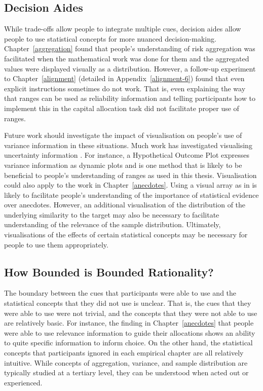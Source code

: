 \documentclass[a4paper, nobind]{templates/ociamthesis}
\theoremstyle{definition}
\theoremstyle{definition}
\theoremstyle{definition}
\theoremstyle{definition}
\theoremstyle{remark}
\begin{document}
\subsection{Decision Aides}

While trade-offs allow people to integrate multiple cues, decision aides allow
people to use statistical concepts for more nuanced decision-making.
Chapter~\ref{aggregation} found that people's understanding of risk aggregation
was facilitated when the mathematical work was done for them and the aggregated
values were displayed visually as a distribution. However, a follow-up
experiment to Chapter~\ref{alignment} (detailed in Appendix~\ref{alignment-6})
found that even explicit instructions sometimes do not work. That is, even
explaining the way that ranges can be used as reliability information and
telling participants how to implement this in the capital allocation task did
not facilitate proper use of ranges.

Future work should investigate the impact of visualisation on people's use of
variance information in these situations. Much work has investigated visualising
uncertainty information \autocite{bostrom2008,maceachren1992,kinkeldey2017,padilla2018,davis1997,ristovski2014,brodlie2012,johnson2003,potter2012,lipkus1999,lipkus2007,spiegelhalter2011,pang1997,kox2018,lapinski2009,torsneyweir2015}. For instance, a Hypothetical Outcome Plot
\autocite{kale2019,hullman2015} expresses variance information as dynamic plots and is
one method that is likely to be beneficial to people's understanding of ranges
as used in this thesis. Visualisation could also apply to the work in
Chapter~\ref{anecdotes}. Using a visual array as in \textcite{jaramillo2019} is likely to
facilitate people's understanding of the importance of statistical evidence over
anecdotes. However, an additional visualisation of the distribution of the
underlying similarity to the target may also be necessary to facilitate
understanding of the relevance of the sample distribution. Ultimately,
visualisations of the effects of certain statistical concepts may be necessary
for people to use them appropriately.

\subsection{How Bounded is Bounded Rationality?}

The boundary between the cues that participants were able to use and the
statistical concepts that they did not use is unclear. That is, the cues that
they were able to use were not trivial, and the concepts that they were not able
to use are relatively basic. For instance, the finding in
Chapter~\ref{anecdotes} that people were able to use relevance information to
guide their allocations shows an ability to quite specific information to inform
choice. On the other hand, the statistical concepts that participants ignored in
each empirical chapter are all relatively intuitive. While concepts of
aggregation, variance, and sample distribution are typically studied at a
tertiary level, they can be understood when acted out or experienced.
\end{document}
